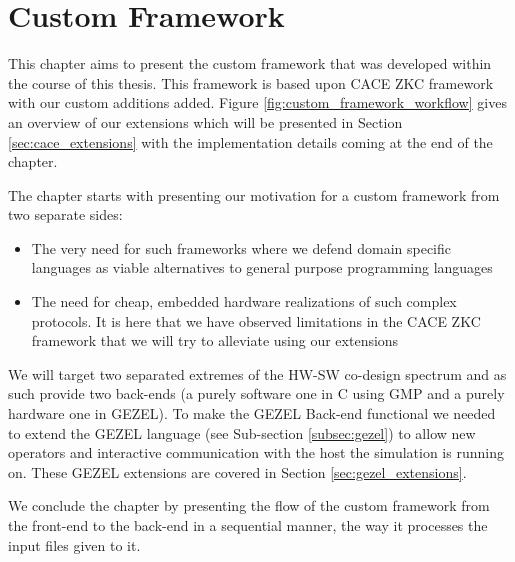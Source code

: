 \chapter{Custom Framework}

This chapter aims to present the custom framework that was developed
within the course of this thesis. This framework is based upon CACE
ZKC framework with our custom additions added. Figure
\ref{fig:custom_framework_workflow} gives an overview of our
extensions which will be presented in Section
\ref{sec:cace_extensions} with the implementation details coming at
the end of the chapter.

The chapter starts with presenting our motivation for a custom
framework from two separate sides:
\begin{itemize}
\item The very need for such frameworks where we defend domain
  specific languages as viable alternatives to general purpose
  programming languages
\item The need for cheap, embedded hardware realizations of such
  complex protocols. It is here that we have observed limitations in
  the CACE ZKC framework that we will try to alleviate using our
  extensions
\end{itemize}
We will target two separated extremes of the HW-SW co-design spectrum
and as such provide two back-ends (a purely software one in C using
GMP and a purely hardware one in GEZEL).  To make the GEZEL Back-end
functional we needed to extend the GEZEL language (see Sub-section
\ref{subsec:gezel}) to allow new operators and interactive
communication with the host the simulation is running on. These GEZEL
extensions are covered in Section \ref{sec:gezel_extensions}.

We conclude the chapter by presenting the flow of the custom framework
from the front-end to the back-end in a sequential manner, the way it
processes the input files given to it.

